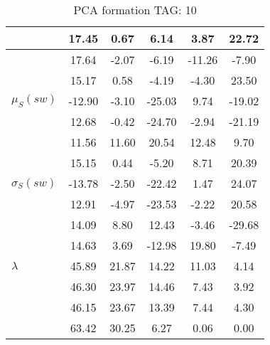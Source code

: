 \begin{table}[h!]
\begin{center}
\begin{tabular}{| l | c | c | c | c | c |}
 & 17.45  & 0.67  & 6.14  & 3.87  & 22.72 \\\hline
 & 17.64  & -2.07  & -6.19  & -11.26  & -7.90 \\\hline
 & 15.17  & 0.58  & -4.19  & -4.30  & 23.50 \\\hline
$\mu_S(sw)$ & -12.90  & -3.10  & -25.03  & 9.74  & -19.02 \\\hline
 & 12.68  & -0.42  & -24.70  & -2.94  & -21.19 \\\hline
 & 11.56  & 11.60  & 20.54  & 12.48  & 9.70 \\\hline
 & 15.15  & 0.44  & -5.20  & 8.71  & 20.39 \\\hline
$\sigma_S(sw)$ & -13.78  & -2.50  & -22.42  & 1.47  & 24.07 \\\hline
 & 12.91  & -4.97  & -23.53  & -2.22  & 20.58 \\\hline
 & 14.09  & 8.80  & 12.43  & -3.46  & -29.68 \\\hline
 & 14.63  & 3.69  & -12.98  & 19.80  & -7.49 \\\hline
$\lambda$ & 45.89  & 21.87  & 14.22  & 11.03  & 4.14 \\\hline
 & 46.30  & 23.97  & 14.46  & 7.43  & 3.92 \\\hline
 & 46.15  & 23.67  & 13.39  & 7.44  & 4.30 \\\hline
 & 63.42  & 30.25  & 6.27  & 0.06  & 0.00 \\\hline
\end{tabular}
\caption{PCA formation TAG: 10}
\end{center}
\end{table}